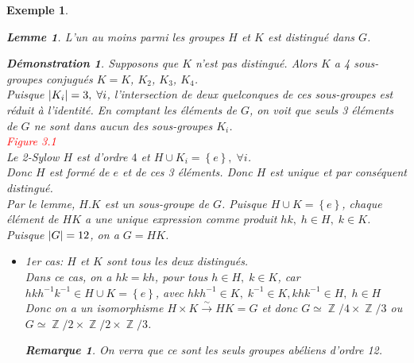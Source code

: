 \documentclass[a4paper, oneside]{report}
\theoremstyle{break}
\newtheorem{lemme}[thm]{Lemme}
\newtheorem{exemple}[thm]{Exemple}
\newtheorem{remarque}[thm]{Remarque}
\newtheorem*{demonstration}{Démonstration}
\newcommand{\red}[1]{\textcolor{red}{#1}}
\newcommand{\fong}{\overset{\sim}{\rightarrow}}
\DeclareMathOperator{\Z}{\mathbb{Z}}
\DeclarePairedDelimiter\ens{\left\{ }{\right\} }%
\DeclarePairedDelimiter\abs{\lvert}{\rvert}%
\renewcommand{\ens}[1]{\left\{ #1 \right\} }%
\begin{document}
\begin{exemple}
\begin{lemme}
L'un au moins parmi les groupes $H$ et $K$ est distingué dans $G$.
\end{lemme}

\begin{demonstration}
Supposons que $K$ n'est pas distingué. Alors $K$ a 4 sous-groupes conjugués $K = K$, $K_2$, $K_3$, $K_4$.\\
Puisque $\abs{K_i} = 3, \; \forall i$, l'intersection de deux quelconques de ces sous-groupes est réduit à l'identité. En comptant les éléments de $G$, on voit que seuls 3 éléments de $G$ ne sont dans aucun des sous-groupes $K_i$.\\

\red{Figure 3.1}\\

Le 2-Sylow $H$ est d'ordre $4$ et $H \cup K_i = \ens{e}, \; \forall i$.\\
Donc $H$ est formé de $e$ et de ces 3 éléments. Donc $H$ est unique et par conséquent distingué.\\
Par le lemme, $H.K$ est un sous-groupe de $G$. Puisque $H \cup K = \ens{e}$, chaque élément de $HK$ a une unique expression comme produit $hk, \; h \in H, \; k \in K$. Puisque $\abs{G} = 12$, on a $G = HK$.
\begin{itemize}
\item 1er cas: $H$ et $K$ sont tous les deux distingués.\\
Dans ce cas, on a $hk = kh$, pour tous $h \in H, \; k \in K$, car	\quad	$hkh^{-1}k^{-1} \in  H \cup K = \ens{e}$, avec $hkh^{-1} \in K, \; k^{-1} \in K, khk^{-1} \in H, \; h \in H$\\
Donc on a un isomorphisme $H \times K \fong HK = G$ et donc $G \simeq \Z/4 \times \Z/3$ ou $G \simeq \Z/2 \times \Z/2 \times \Z/3$.

\begin{remarque}
On verra que ce sont les seuls groupes abéliens d'ordre 12.
\end{remarque}


\end{itemize}
\end{demonstration}
\end{exemple}
\end{document}
